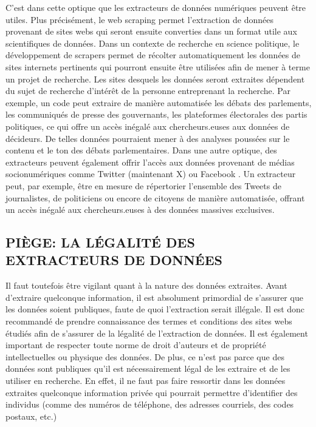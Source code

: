 \documentclass[
  letterpaper,
  DIV=11,
  numbers=noendperiod]{scrreprt}
\begin{document}
C'est dans cette optique que les extracteurs de données numériques
peuvent être utiles. Plus précisément, le web scraping permet
l'extraction de données provenant de sites webs qui seront ensuite
converties dans un format utile aux scientifiques de données. Dans un
contexte de recherche en science politique, le développement de scrapers
permet de récolter automatiquement les données de sites internets
pertinents qui pourront ensuite être utilisées afin de mener à terme un
projet de recherche. Les sites desquels les données seront extraites
dépendent du sujet de recherche d'intérêt de la personne entreprenant la
recherche. Par exemple, un code peut extraire de manière automatisée les
débats des parlements, les communiqués de presse des gouvernants, les
plateformes électorales des partis politiques, ce qui offre un accès
inégalé aux chercheurs.euses aux données de décideurs. De telles données
pourraient mener à des analyses poussées sur le contenu et le ton des
débats parlementaires. Dans une autre optique, des extracteurs peuvent
également offrir l'accès aux données provenant de médias socionumériques
comme Twitter (maintenant X) ou Facebook . Un extracteur peut, par
exemple, être en mesure de répertorier l'ensemble des Tweets de
journalistes, de politiciens ou encore de citoyens de manière
automatisée, offrant un accès inégalé aux chercheurs.euses à des données
massives exclusives.

\hypertarget{piuxe8ge-la-luxe9galituxe9-des-extracteurs-de-donnuxe9es}{%
\subsection{PIÈGE: LA LÉGALITÉ DES EXTRACTEURS DE
DONNÉES}\label{piuxe8ge-la-luxe9galituxe9-des-extracteurs-de-donnuxe9es}}

Il faut toutefois être vigilant quant à la nature des données extraites.
Avant d'extraire quelconque information, il est absolument primordial de
s'assurer que les données soient publiques, faute de quoi l'extraction
serait illégale. Il est donc recommandé de prendre connaissance des
termes et conditions des sites webs étudiés afin de s'assurer de la
légalité de l'extraction de données. Il est également important de
respecter toute norme de droit d'auteurs et de propriété intellectuelles
ou physique des données. De plus, ce n'est pas parce que des données
sont publiques qu'il est nécessairement légal de les extraire et de les
utiliser en recherche. En effet, il ne faut pas faire ressortir dans les
données extraites quelconque information privée qui pourrait permettre
d'identifier des individus (comme des numéros de téléphone, des adresses
courriels, des codes postaux, etc.)
\end{document}
